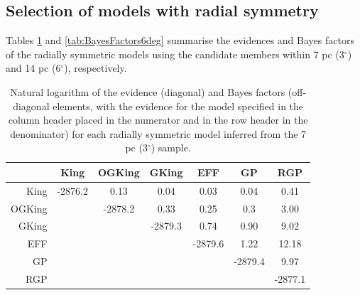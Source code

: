 \subsection{Selection of models with radial symmetry} 

Tables \ref{tab:BayesFactors3deg} and \ref{tab:BayesFactors6deg} summarise the evidences and Bayes factors of the radially symmetric models using the candidate members within  7 pc (3$^{\circ}$) and 14 pc (6$^{\circ}$), respectively. 
\begin{table}[ht]
  \centering
      \caption{Natural logarithm of the evidence (diagonal) and Bayes factors (off-diagonal elements, with the evidence for the model specified in the column header placed in the numerator and in the row header in the denominator) for each radially symmetric model inferred from the 7 pc (3$^{\circ}$) sample.}
         \begin{tabular}{rcccccc}
           & King & OGKing  &   GKing & EFF & GP & RGP \\
\hline              
           King    &-2876.2 &  0.13   &   0.04  &  0.03   &   0.04  &  0.41  \\
           OGKing  &        &-2878.2  &   0.33  &  0.25   &   0.3   &  3.00  \\
           GKing   &        &         &-2879.3  &  0.74   &   0.90  &  9.02  \\
           EFF     &        &         &         &-2879.6  &   1.22  & 12.18  \\
           GP      &        &         &         &         &-2879.4  &  9.97  \\
           RGP     &        &         &         &         &         &-2877.1 \\
         \end{tabular}
  \label{tab:BayesFactors3deg}
   \end{table}
   
